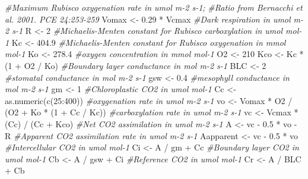 \documentclass[
]{krantz}
\makeatletter
\newenvironment{Shaded}{\begin{snugshade}}{\end{snugshade}}
\newcommand{\CommentTok}[1]{\textcolor[rgb]{0.56,0.35,0.01}{\textit{#1}}}
\newcommand{\DecValTok}[1]{\textcolor[rgb]{0.00,0.00,0.81}{#1}}
\newcommand{\FloatTok}[1]{\textcolor[rgb]{0.00,0.00,0.81}{#1}}
\newcommand{\FunctionTok}[1]{\textcolor[rgb]{0.00,0.00,0.00}{#1}}
\newcommand{\NormalTok}[1]{#1}
\newcommand{\OtherTok}[1]{\textcolor[rgb]{0.56,0.35,0.01}{#1}}
\newcommand{\SpecialCharTok}[1]{\textcolor[rgb]{0.00,0.00,0.00}{#1}}
\newenvironment{kframe}{%
\medskip{}
\setlength{\fboxsep}{.8em}
 \def\at@end@of@kframe{}%
 \ifinner\ifhmode%
  \def\at@end@of@kframe{\end{minipage}}%
  \begin{minipage}{\columnwidth}%
 \fi\fi%
 \def\FrameCommand##1{\hskip\@totalleftmargin \hskip-\fboxsep
 \colorbox{shadecolor}{##1}\hskip-\fboxsep
     \hskip-\linewidth \hskip-\@totalleftmargin \hskip\columnwidth}%
 \MakeFramed {\advance\hsize-\width
   \@totalleftmargin\z@ \linewidth\hsize
   \@setminipage}}%
 {\par\unskip\endMakeFramed%
 \at@end@of@kframe}
\renewenvironment{Shaded}{\begin{kframe}}{\end{kframe}}
\makeatother
\begin{document}
\begin{Shaded}
\begin{Highlighting}[]
\CommentTok{\#Maximum Rubisco oxygenation rate in umol m{-}2 s{-}1;}
\CommentTok{\#Ratio from Bernacchi et al. 2001. PCE 24:253{-}259}
\NormalTok{Vomax }\OtherTok{\textless{}{-}} \FloatTok{0.29} \SpecialCharTok{*}\NormalTok{ Vcmax}
\CommentTok{\#Dark respiration in umol m{-}2 s{-}1}
\NormalTok{R }\OtherTok{\textless{}{-}} \DecValTok{2}
\CommentTok{\#Michaelis{-}Menten constant for Rubisco carboxylation in umol mol{-}1}
\NormalTok{Kc }\OtherTok{\textless{}{-}} \FloatTok{404.9}
\CommentTok{\#Michaelis{-}Menten constant for Rubisco oxygenation in mmol mol{-}1}
\NormalTok{Ko }\OtherTok{\textless{}{-}} \FloatTok{278.4}
\CommentTok{\#oxygen concentration in mmol mol{-}1}
\NormalTok{O2 }\OtherTok{\textless{}{-}} \DecValTok{210}
\NormalTok{Kco }\OtherTok{\textless{}{-}}\NormalTok{ Kc }\SpecialCharTok{*}\NormalTok{ (}\DecValTok{1} \SpecialCharTok{+}\NormalTok{ O2 }\SpecialCharTok{/}\NormalTok{ Ko)}
\CommentTok{\#Boundary layer conductance in mol m{-}2 s{-}1}
\NormalTok{BLC }\OtherTok{\textless{}{-}} \DecValTok{2}
\CommentTok{\#stomatal conductance in mol m{-}2 s{-}1}
\NormalTok{gsw }\OtherTok{\textless{}{-}} \FloatTok{0.4}
\CommentTok{\#mesophyll conductance in mol m{-}2 s{-}1}
\NormalTok{gm }\OtherTok{\textless{}{-}} \DecValTok{1}
\CommentTok{\#Chloroplastic CO2 in umol mol{-}1}
\NormalTok{Cc }\OtherTok{\textless{}{-}} \FunctionTok{as.numeric}\NormalTok{(}\FunctionTok{c}\NormalTok{(}\DecValTok{25}\SpecialCharTok{:}\DecValTok{400}\NormalTok{))}
\CommentTok{\#oxygenation rate in umol m{-}2 s{-}1}
\NormalTok{vo }\OtherTok{\textless{}{-}}\NormalTok{ Vomax }\SpecialCharTok{*}\NormalTok{ O2 }\SpecialCharTok{/}\NormalTok{ (O2 }\SpecialCharTok{+}\NormalTok{ Ko }\SpecialCharTok{*}\NormalTok{ (}\DecValTok{1} \SpecialCharTok{+}\NormalTok{ Cc }\SpecialCharTok{/}\NormalTok{ Kc))}
\CommentTok{\#carboxylation rate in umol m{-}2 s{-}1}
\NormalTok{vc }\OtherTok{\textless{}{-}}\NormalTok{ Vcmax }\SpecialCharTok{*}\NormalTok{ (Cc) }\SpecialCharTok{/}\NormalTok{ (Cc }\SpecialCharTok{+}\NormalTok{ Kco)}
\CommentTok{\#Net CO2 assimilation in umol m{-}2 s{-}1}
\NormalTok{A }\OtherTok{\textless{}{-}}\NormalTok{ vc }\SpecialCharTok{{-}} \FloatTok{0.5} \SpecialCharTok{*}\NormalTok{ vo }\SpecialCharTok{{-}}\NormalTok{ R}
\CommentTok{\#Apparent CO2 assimilation rate in umol m{-}2 s{-}1}
\NormalTok{Aapparent }\OtherTok{\textless{}{-}}\NormalTok{ vc }\SpecialCharTok{{-}} \FloatTok{0.5} \SpecialCharTok{*}\NormalTok{ vo}
\CommentTok{\#Intercellular CO2 in umol mol{-}1}
\NormalTok{Ci }\OtherTok{\textless{}{-}}\NormalTok{ A }\SpecialCharTok{/}\NormalTok{ gm }\SpecialCharTok{+}\NormalTok{ Cc}
\CommentTok{\#Boundary layer CO2 in umol mol{-}1}
\NormalTok{Cb }\OtherTok{\textless{}{-}}\NormalTok{ A }\SpecialCharTok{/}\NormalTok{ gsw }\SpecialCharTok{+}\NormalTok{ Ci}
\CommentTok{\#Reference CO2 in umol mol{-}1}
\NormalTok{Cr }\OtherTok{\textless{}{-}}\NormalTok{ A }\SpecialCharTok{/}\NormalTok{ BLC }\SpecialCharTok{+}\NormalTok{ Cb}


\end{Highlighting}
\end{Shaded}
\end{document}
